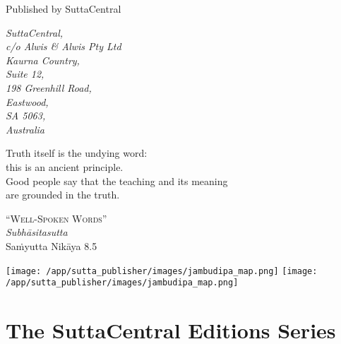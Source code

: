 \documentclass[12pt,openany]{book}%
\newcommand{\blankpage}{
\newpage
\thispagestyle{empty}
\mbox{}
\newpage
}
\newcommand*{\epigraphTranslatedTitle}[1]{\vspace*{.5em}\footnotesize\textsc{#1}\\}%
\newcommand*{\epigraphRootTitle}[1]{\footnotesize\textit{#1}\\}%
\newcommand*{\epigraphReference}[1]{\footnotesize{#1}}%
\begin{document}
\begin{footnotesize}
\medskip

Published by SuttaCentral

\medskip

\textit{SuttaCentral,\\
c/o Alwis \& Alwis Pty Ltd\\
Kaurna Country,\\
Suite 12,\\
198 Greenhill Road,\\
Eastwood,\\
SA 5063,\\
Australia}

\end{footnotesize}

\newpage

\setlength{\parindent}{1em}%
\newpage

\vspace*{\fill}

\begin{center}
\epigraph{Truth itself is the undying word:\\
this is an ancient principle.\\
Good people say that the teaching and its meaning\\
are grounded in the truth.}
{
\epigraphTranslatedTitle{“Well-Spoken Words”}
\epigraphRootTitle{\textsanskrit{Subhāsitasutta}}
\epigraphReference{\textsanskrit{Saṁyutta} \textsanskrit{Nikāya} 8.5}
}
\end{center}

\vspace*{2in}

\vspace*{\fill}

\setlength{\parindent}{0em}
\sbox{}%
\texttt{[image: /app/sutta\_publisher/images/jambudipa\_map.png]}
\newpage
\texttt{[image: /app/sutta\_publisher/images/jambudipa\_map.png]}
\newpage
\restoregeometry

\blankpage%

\setlength{\parindent}{1em}
%
\tableofcontents
\newpage
\pagestyle{fancy}
%
\chapter*{The SuttaCentral Editions Series}
\end{document}
